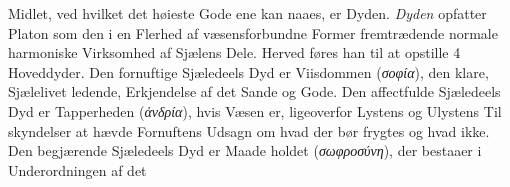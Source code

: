\documentclass[12pt,a4paper]{book}
\newcommand{\gk}[1]{\textit{#1}}
\begin{document}
Midlet, ved hvilket det høieste Gode ene kan naaes, er
Dyden. \emph{Dyden} opfatter Platon som den i en Flerhed af
væsensforbundne Former fremtrædende normale harmoniske
Virksomhed af Sjælens Dele. Herved føres han til at opstille
4 Hoveddyder. Den fornuftige Sjæledeels Dyd er Viisdommen
(\gk{σοφία}), den klare, Sjælelivet ledende, Erkjendelse af det Sande
og Gode. Den affectfulde Sjæledeels Dyd er Tapperheden
(\gk{ἀνδρία}), hvis Væsen er, ligeoverfor Lystens og Ulystens Til\-%
skyndelser at hævde Fornuftens Udsagn om hvad der bør
frygtes og hvad ikke. Den begjærende Sjæledeels Dyd er Maade\-%
holdet (\gk{σωφροσύνη}), der bestaaer i Underordningen af det
\end{document}
